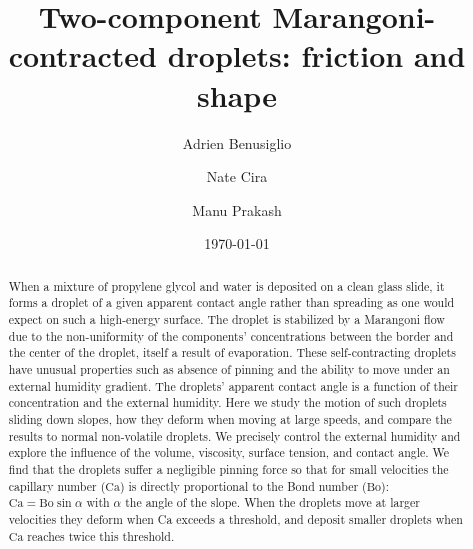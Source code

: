 \documentclass[aps,prl,reprint,superscriptaddress,amsmath,amssymb,]{revtex4-1}
\begin{document}

\title{Two-component Marangoni-contracted droplets: friction and shape}%


\author{Adrien Benusiglio}




\author{Nate Cira}

\author{Manu Prakash}

\date{\today}%

\begin{abstract}
When a mixture of propylene glycol and water is deposited on a clean glass slide, it forms a droplet of a given apparent contact angle rather than spreading as one would expect on such a high-energy surface. The droplet is stabilized by a Marangoni flow due to the non-uniformity of the components' concentrations between the border and the center of the droplet, itself a result of evaporation. These self-contracting droplets have unusual properties such as absence of pinning and the ability to move under an external humidity gradient. The droplets' apparent contact angle is a function of their concentration and the external humidity. Here we study the motion of such droplets sliding down slopes, how they deform when moving at large speeds, and compare the results to normal non-volatile droplets. We precisely control the external humidity and explore the influence of the volume, viscosity, surface tension, and contact angle. We find that the droplets suffer a negligible pinning force so that for small velocities the capillary number ($\mathrm{Ca}$) is directly proportional to the Bond number ($\mathrm{Bo}$): $\mathrm{Ca}=\mathrm{Bo} \sin\alpha$ with $\alpha$ the angle of the slope. When the droplets move at larger velocities they deform when Ca exceeds a threshold, and deposit smaller droplets when $\mathrm{Ca}$ reaches twice this threshold.
\end{abstract}


\maketitle
\end{document}
